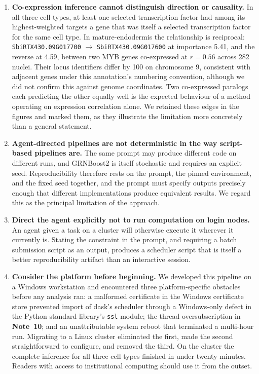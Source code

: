 \begin{enumerate}[leftmargin=*]
\item \textbf{Co-expression inference cannot distinguish direction or causality.} In all three cell types, at least one selected transcription factor had among its highest-weighted targets a gene that was itself a selected transcription factor for the same cell type. In mature-endodermis the relationship is reciprocal: \texttt{SbiRTX430.09G017700} $\rightarrow$ \texttt{SbiRTX430.09G017600} at importance 5.41, and the reverse at 4.59, between two MYB genes co-expressed at $r = 0.56$ across 282 nuclei. Their locus identifiers differ by 100 on chromosome 9, consistent with adjacent genes under this annotation's numbering convention, although we did not confirm this against genome coordinates. Two co-expressed paralogs each predicting the other equally well is the expected behaviour of a method operating on expression correlation alone. We retained these edges in the figures and marked them, as they illustrate the limitation more concretely than a general statement.

\item \textbf{Agent-directed pipelines are not deterministic in the way script-based pipelines are.} The same prompt may produce different code on different runs, and GRNBoost2 is itself stochastic and requires an explicit seed. Reproducibility therefore rests on the prompt, the pinned environment, and the fixed seed together, and the prompt must specify outputs precisely enough that different implementations produce equivalent results. We regard this as the principal limitation of the approach.

\item \textbf{Direct the agent explicitly not to run computation on login nodes.} An agent given a task on a cluster will otherwise execute it wherever it currently is. Stating the constraint in the prompt, and requiring a batch submission script as an output, produces a scheduler script that is itself a better reproducibility artifact than an interactive session.

\item \textbf{Consider the platform before beginning.} We developed this pipeline on a Windows workstation and encountered three platform-specific obstacles before any analysis ran: a malformed certificate in the Windows certificate store prevented import of dask's scheduler through a Windows-only defect in the Python standard library's \texttt{ssl} module; the thread oversubscription in \textbf{Note~10}; and an unattributable system reboot that terminated a multi-hour run. Migrating to a Linux cluster eliminated the first, made the second straightforward to configure, and removed the third. On the cluster the complete inference for all three cell types finished in under twenty minutes. Readers with access to institutional computing should use it from the outset.


\end{enumerate}
